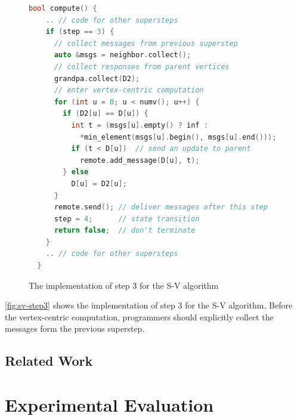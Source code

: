 \documentclass{sokendai_thesis} %
\begin{document}
\begin{figure}[ht]
\centering
\vspace{-2ex}
\begin{lstlisting}[basicstyle=\small,numbers=none,xleftmargin=0em,language=c++]
  bool compute() {
    .. // code for other supersteps
    if (step == 3) {
      // collect messages from previous superstep
      auto &msgs = neighbor.collect();
      // collect responses from parent vertices
      grandpa.collect(D2);
      // enter vertex-centric computation
      for (int u = 0; u < numv(); u++) {
        if (D2[u] == D[u]) {
          int t = (msgs[u].empty() ? inf : 
            *min_element(msgs[u].begin(), msgs[u].end()));
          if (t < D[u])  // send an update to parent
            remote.add_message(D[u], t);
        } else
          D[u] = D2[u];
      }
      remote.send(); // deliver messages after this step
      step = 4;      // state transition
      return false;  // don't terminate
    }
    .. // code for other supersteps
  }
\end{lstlisting}
\vspace{-2ex}
\caption{The implementation of step 3 for the S-V algorithm}
\label{fig:sv-step3}
\end{figure}

\autoref{fig:sv-step3} shows the implementation of step 3 for the S-V algorithm.
Before the vertex-centric computation, programmers should explicitly collect the messages form the previous superstep.

\section{Related Work}



\chapter{Experimental Evaluation}
\label{sec:evaluation}
\end{document}
